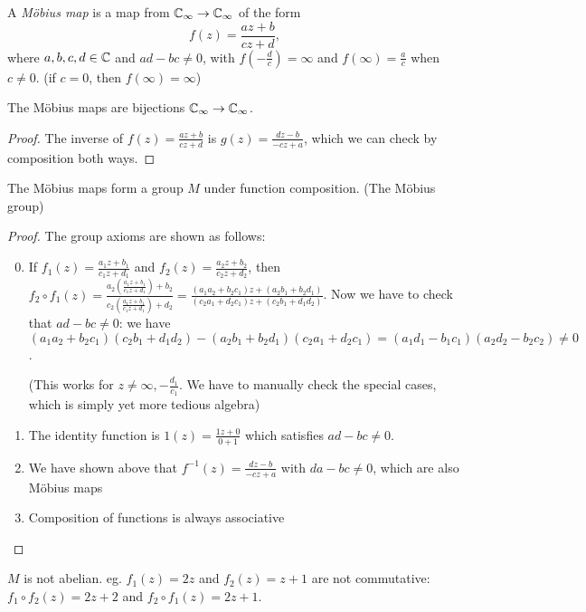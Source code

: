 \documentclass[a4paper]{article}
\begin{document}
  \begin{defi}
    A \emph{M\"obius map} is a map from $\mathbb{C}_\infty \to \mathbb{C}_\infty$ of the form
    \[
      f(z) = \frac{az + b}{cz + d},
    \]
    where $a, b, c, d\in \mathbb{C}$ and $ad - bc\not= 0$, with $f(-\frac{d}{c}) = \infty$ and $f(\infty) = \frac{a}{c}$ when $c\not= 0$. (if $c = 0$, then $f(\infty)=\infty$)
  \end{defi}

  \begin{lemma}
    The M\"obius maps are bijections $\mathbb{C}_\infty \to \mathbb{C}_\infty$. 
  \end{lemma}

  \begin{proof}
    The inverse of $f(z) = \frac{az + b}{cz+ d}$ is $g(z) = \frac{dz - b}{-cz + a}$, which we can check by composition both ways.
  \end{proof}

  \begin{prop}
    The M\"obius maps form a group $M$ under function composition. (The M\"obius group)
  \end{prop}
  \begin{proof}
    The group axioms are shown as follows:
    \begin{enumerate}[label=\arabic{*}.]
        \setcounter{enumi}{-1}
      \item If $f_1(z) = \frac{a_1z + b_1}{c_1z + d_1}$ and $f_2(z) = \frac{a_2z + b_2}{c_2 z + d_2}$, then $\displaystyle f_2\circ f_1 (z) = \frac{a_2\left(\frac{a_1z + b_1}{c_1z + d_1}\right) + b_2}{c_2\left(\frac{a_1z + b_1}{c_1z + d_1}\right) + d_2} = \frac{(a_1a_2 + b_2c_1)z + (a_2b_1 + b_2d_1)}{(c_2a_1 + d_2c_1)z + (c_2b_1 + d_1d_2)}$. Now we have to check that $ad - bc \not = 0$: we have $(a_1a_2 + b_2c_1)(c_2b_1 + d_1d_2) - (a_2b_1 + b_2d_1)(c_2a_1 + d_2c_1) = (a_1d_1 - b_1c_1)(a_2d_2 - b_2c_2)\not =0 $.

        (This works for $z\not= \infty, -\frac{d_1}{c_1}$. We have to manually check the special cases, which is simply yet more tedious algebra)
      \item The identity function is $1(z) = \frac{1z + 0}{0 + 1}$ which satisfies $ad - bc \not= 0$.
      \item We have shown above that $f^{-1}(z) = \frac{dz - b}{-cz + a}$ with $da - bc\not= 0$, which are also M\"obius maps
      \item Composition of functions is always associative
    \end{enumerate}
  \end{proof}
  \note $M$ is not abelian. eg. $f_1(z) = 2z$ and $f_2(z) = z + 1$ are not commutative: $f_1\circ f_2(z) = 2z+2$ and $f_2\circ f_1(z) = 2z + 1$.
\end{document}
